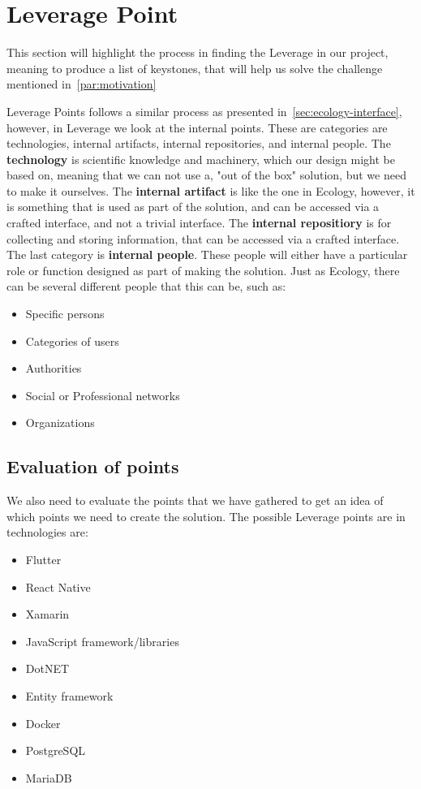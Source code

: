 \section{Leverage Point}\label{sec:leverage}
This section will highlight the process in finding the Leverage in our project, meaning to produce a list of keystones, that will help us solve the challenge mentioned in~\autoref{par:motivation}

Leverage Points follows a similar process as presented in~\autoref{sec:ecology-interface}, however, in Leverage we look at the internal points.
These are categories are technologies, internal artifacts, internal repositories, and internal people.
The \textbf{technology} is scientific knowledge and machinery, which our design might be based on, meaning that we can not use a, "out of the box" solution, but we need to make it ourselves.
The \textbf{internal artifact} is like the one in Ecology, however, it is something that is used as part of the solution, and can be accessed via a crafted interface, and not a trivial interface.
The \textbf{internal repositiory} is for collecting and storing information, that can be accessed via a crafted interface.
The last category is \textbf{internal people}.
These people will either have a particular role or function designed as part of making the solution.
Just as Ecology, there can be several different people that this can be, such as:

\begin{itemize}
    \item Specific persons
    \item Categories of users
    \item Authorities
    \item Social or Professional networks
    \item Organizations
\end{itemize}

\subsection{Evaluation of points}
We also need to evaluate the points that we have gathered to get an idea of which points we need to create the solution.
The possible Leverage points are in technologies are:

\begin{itemize}
    \item Flutter
    \item React Native
    \item Xamarin
    \item JavaScript framework/libraries
    \item DotNET
    \item Entity framework
    \item Docker
    \item PostgreSQL
    \item MariaDB
\end{itemize}

